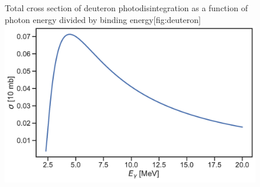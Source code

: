 \begin{figure}[H]
	\begin{sidecaption}{Total cross section of deuteron photodisintegration as a function of photon energy divided by binding energy}[fig:deuteron]
		\includegraphics[width=\linewidth]{Figures/Deuteron.pdf}
	\end{sidecaption}
\end{figure}